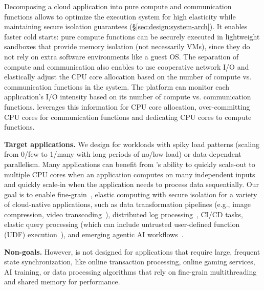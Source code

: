 Decomposing a cloud application into pure compute and communication functions allows \dandelion to optimize the execution system for high elasticity while maintaining secure isolation guarantees (\S\ref{sec:design:system-arch}).
It enables faster cold starts: pure compute functions can be securely executed in lightweight sandboxes that provide memory isolation (not necessarily VMs), since they do not rely on extra software environments like a guest OS.
The separation of compute and communication also enables \dandelion to use cooperative network I/O and elastically adjust the CPU core allocation based on the number of compute vs. communication functions in the system. The platform can monitor each application's I/O intensity based on its number of compute vs. communication functions. \dandelion leverages this information for CPU core allocation, over-committing CPU cores for communication functions and dedicating CPU cores to compute functions.

\textbf{Target applications.} We design \dandelion for workloads with spiky load patterns (scaling from 0/few to 1/many with long periods of no/low load) or data-dependent parallelism. Many applications can benefit from \dandelion's ability to quickly scale-out to multiple CPU cores when an application computes on many independent inputs and quickly scale-in when the application needs to process data sequentially.
Our goal is to enable fine-grain~\cite{granular-computing}, elastic computing with secure isolation for a variety of cloud-native applications, such as data transformation pipelines (e.g., image compression, video transcoding~\cite{opencv, excamera}), distributed log processing~\cite{minio-log-processing}, CI/CD tasks, elastic query processing (which can include untrusted user-defined function (UDF) execution~\cite{containerized-udf}), and emerging agentic AI workflows~\cite{compound-ai-blog, agentic-ai-databricks}.

\textbf{Non-goals.} However, \dandelion is not designed for applications that require large, frequent state synchronization, like online transaction processing, online gaming services, AI training, or data processing algorithms that rely on fine-grain multithreading and shared memory for performance.